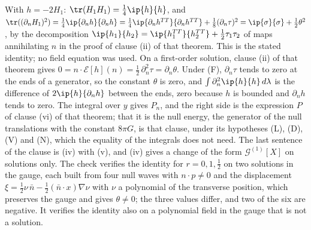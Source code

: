 With $h = -2H_{1}$: $\tr(H_{1}H_{1}) = \tfrac14\ip{h}{h}$, and $\tr((\partial_{n}H_{1})^{2}) = \tfrac14\ip{\partial_{n}h}{\partial_{n}h} = \tfrac14\ip{\partial_{n}h^{TT}}{\partial_{n}h^{TT}} + \tfrac18(\partial_{n}\tau)^{2} = \ip{\sigma}{\sigma} + \tfrac12\theta^{2}$, by the decomposition $\ip{h_{1}}{h_{2}} = \ip{h_{1}^{TT}}{h_{2}^{TT}} + \tfrac12\tau_{1}\tau_{2}$ of maps annihilating $n$ in the proof of clause (ii) of that theorem. This is the stated identity; no field equation was used. On a first-order solution, clause (ii) of that theorem gives $0 = n \cdot \mathcal{E}[h](n) = \tfrac12\,\partial_{n}^{2}\tau = \partial_{n}\theta$. Under (F), $\partial_{n}\tau$ tends to zero at the ends of a generator, so the constant $\theta$ is zero, and $\int\partial_{n}^{2}\ip{h}{h}\,d\lambda$ is the difference of $2\ip{h}{\partial_{n}h}$ between the ends, zero because $h$ is bounded and $\partial_{n}h$ tends to zero. The integral over $y$ gives $P_{n}$, and the right side is the expression $P$ of clause (vi) of that theorem; that it is the null energy, the generator of the null translations with the constant $8\pi G$, is that clause, under its hypotheses (L), (D), (V) and (N), which the equality of the integrals does not need. The last sentence of the clause is (iv) with (v), and (iv) gives a change of the form $\mathcal{G}^{(1)}[X]$ on solutions only. The check verifies the identity for $r = 0, 1, \tfrac12$ on two solutions in the gauge, each built from four null waves with $n \cdot p \neq 0$ and the displacement $\xi = \tfrac12\nu\,\bar n - \tfrac12(\bar n \cdot x)\nabla\nu$ with $\nu$ a polynomial of the transverse position, which preserves the gauge and gives $\theta \neq 0$; the three values differ, and two of the six are negative. It verifies the identity also on a polynomial field in the gauge that is not a solution.

